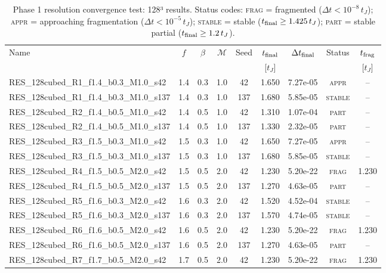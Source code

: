 \begin{table}
\centering
\caption{Phase 1 resolution convergence test: 128³ results. Status codes:
  \textsc{frag} = fragmented ($\Delta t < 10^{-8}\,t_J$);
  \textsc{appr} = approaching fragmentation ($\Delta t < 10^{-5}\,t_J$);
  \textsc{stable} = stable ($t_{\rm final} \geq 1.425\,t_J$);
  \textsc{part} = stable partial ($t_{\rm final} \geq 1.2\,t_J$).}
\label{tab:phase1_128}
\begin{tabular}{lcccccccc}
\hline
Name & $f$ & $\beta$ & $\mathcal{M}$ & Seed & $t_{\rm final}$ & $\Delta t_{\rm final}$ & Status & $t_{\rm frag}$ \\
 & & & & & [$t_J$] & & & [$t_J$] \\
\hline
  RES\_128cubed\_R1\_f1.4\_b0.3\_M1.0\_s42 & 1.4 & 0.3 & 1.0 & 42 & 1.650 & 7.27e-05 & \textsc{appr} & -- \\
  RES\_128cubed\_R1\_f1.4\_b0.3\_M1.0\_s137 & 1.4 & 0.3 & 1.0 & 137 & 1.680 & 5.85e-05 & \textsc{stable} & -- \\
  RES\_128cubed\_R2\_f1.4\_b0.5\_M1.0\_s42 & 1.4 & 0.5 & 1.0 & 42 & 1.310 & 1.07e-04 & \textsc{part} & -- \\
  RES\_128cubed\_R2\_f1.4\_b0.5\_M1.0\_s137 & 1.4 & 0.5 & 1.0 & 137 & 1.330 & 2.32e-05 & \textsc{part} & -- \\
  RES\_128cubed\_R3\_f1.5\_b0.3\_M1.0\_s42 & 1.5 & 0.3 & 1.0 & 42 & 1.650 & 7.27e-05 & \textsc{appr} & -- \\
  RES\_128cubed\_R3\_f1.5\_b0.3\_M1.0\_s137 & 1.5 & 0.3 & 1.0 & 137 & 1.680 & 5.85e-05 & \textsc{stable} & -- \\
  RES\_128cubed\_R4\_f1.5\_b0.5\_M2.0\_s42 & 1.5 & 0.5 & 2.0 & 42 & 1.230 & 5.20e-22 & \textsc{frag} & 1.230 \\
  RES\_128cubed\_R4\_f1.5\_b0.5\_M2.0\_s137 & 1.5 & 0.5 & 2.0 & 137 & 1.270 & 4.63e-05 & \textsc{part} & -- \\
  RES\_128cubed\_R5\_f1.6\_b0.3\_M2.0\_s42 & 1.6 & 0.3 & 2.0 & 42 & 1.520 & 4.52e-04 & \textsc{stable} & -- \\
  RES\_128cubed\_R5\_f1.6\_b0.3\_M2.0\_s137 & 1.6 & 0.3 & 2.0 & 137 & 1.570 & 4.74e-05 & \textsc{stable} & -- \\
  RES\_128cubed\_R6\_f1.6\_b0.5\_M2.0\_s42 & 1.6 & 0.5 & 2.0 & 42 & 1.230 & 5.20e-22 & \textsc{frag} & 1.230 \\
  RES\_128cubed\_R6\_f1.6\_b0.5\_M2.0\_s137 & 1.6 & 0.5 & 2.0 & 137 & 1.270 & 4.63e-05 & \textsc{part} & -- \\
  RES\_128cubed\_R7\_f1.7\_b0.5\_M2.0\_s42 & 1.7 & 0.5 & 2.0 & 42 & 1.230 & 5.20e-22 & \textsc{frag} & 1.230 \\

\end{tabular}
\end{table}
